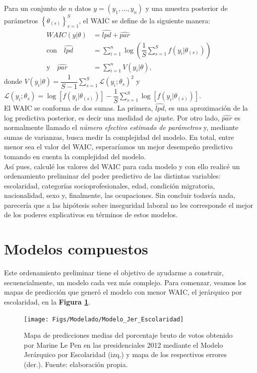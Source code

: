 Para un conjunto de $n$ datos $y=(y_1,\dots,y_n)$ y una muestra posterior de parámetros $\left\lbrace\theta_{(s)}\right\rbrace_{s=1}^S$, el WAIC se define de la siguiente manera:
\begin{align}\label{WAIC}
WAIC(y|\theta) &= \widehat{lpd} + \widehat{par} \\
\text{con} \quad \widehat{lpd} &= \sum_{i=1}^{n} \log\left(\dfrac{1}{S}\sum\limits_{s=1}^S f(y_i|\theta_{(s)}) \right) \nonumber \\
\text{y} \quad \widehat{par} &= \sum\limits_{i=1}^n V(y_i|\theta), \nonumber
\end{align}
donde $V(y_i|\theta)=\dfrac{1}{S-1}\sum\limits_{s=1}^S \mathcal{L}(y_i;\theta_{s})^2$ y $\mathcal{L}(y_i;\theta_{s}) = \log\left[f(y_i|\theta_{(s)})\right] - \dfrac{1}{S}\sum\limits_{s=1}^S \log\left[f(y_i|\theta_{(s)})\right]$.{}\\

El WAIC se conforma de dos sumas. La primera, $\widehat{lpd}$, es una aproximación de la log predictiva posterior, es decir una medidad de ajuste. Por otro lado, $\widehat{par}$ es normalmente llamado el \textit{número efectivo estimado de parámetros} y, mediante sumas de varianzas, busca medir la complejidad del modelo. En total, entre menor sea el valor del WAIC, esperaríamos un mejor desempeño predictivo tomando en cuenta la complejidad del modelo.\\

Así pues, calculé los valores del WAIC para cada modelo y con ello realicé un ordenamiento preliminar del poder predictivo de las distintas variables: escolaridad, categorías socioprofesionales, edad, condición migratoria, nacionalidad, sexo y, finalmente, las ocupaciones. Sin concluir todavía nada, parecería que a las hipótesis sobre inseguridad laboral no les corresponde el mejor de los poderes explicativos en términos de estos modelos.

\section{Modelos compuestos}

Este ordenamiento preliminar tiene el objetivo de ayudarme a construir, secuencialmente, un modelo cada vez más complejo. Para comenzar, veamos los mapas de predicción que generó el modelo con menor WAIC, el jerárquico por escolaridad, en la \textbf{Figura \ref{fig:Modelo_Jer_Escolaridad}}.\\ 

\begin{figure}
	\centering
	\texttt{[image: Figs/Modelado/Modelo\_Jer\_Escolaridad]}
	\caption{Mapa de predicciones medias del porcentaje bruto de votos obtenido por Marine Le Pen en las presidenciales 2012 mediante el Modelo Jerárquico por Escolaridad (izq.) y mapa de los respectivos errores (der.). Fuente: elaboración propia.}
	\label{fig:Modelo_Jer_Escolaridad}
\end{figure}

